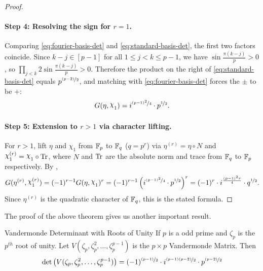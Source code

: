 \begin{proof}
  \paragraph*{Step 4: Resolving the sign for $r=1$.}
  Comparing \eqref{eq:fourier-basis-det} and \eqref{eq:standard-basis-det}, the first two factors coincide. Since $k-j\in[p-1]$ for all $1\leq j<k\leq p-1$, we have $\sin\frac{\pi(k-j)}{p}>0$, so $\prod_{j<k}2\sin\frac{\pi(k-j)}{p}>0$. Therefore the product on the right of \eqref{eq:standard-basis-det} equals $p^{\nicefrac{(p-2)}{2}}$, and matching with \eqref{eq:fourier-basis-det} forces the $\pm$ to be $+$:
  $$G(\eta,\chi_1)=i^{\nicefrac{(p-1)^2}{4}}\cdot p^{\nicefrac12}.$$

  \paragraph*{Step 5: Extension to $r>1$ via character lifting.}
  For $r>1$, lift $\eta$ and $\chi_1$ from $\mathbb{F}_p$ to $\mathbb{F}_q$ ($q=p^r$) via $\eta^{(r)}=\eta\circ N$ and $\chi_1^{(r)}=\chi_1\circ\tr$, where $N$ and $\operatorname{Tr}$ are the absolute norm and trace from $\mathbb{F}_q$ to $\mathbb{F}_p$ respectively. By \DHthm,
  $$G(\eta^{(r)},\chi_1^{(r)})=(-1)^{r-1}G(\eta,\chi_1)^r=(-1)^{r-1}\lt(i^{\nicefrac{(p-1)^2}{4}}\cdot p^{\nicefrac12}\rt)^r=(-1)^r\cdot i^{\frac{(p-1)^2r}{4}}\cdot q^{\nicefrac12}.$$
  Since $\eta^{(r)}$ is the quadratic character of $\mathbb{F}_q$, this is the stated formula.
\end{proof}

The proof of the above theorem gives us another important result. 
\begin{lemma}{Vandermonde Determinant with Roots of Unity}{}
  If $p$ is a odd prime and $\zeta_p$ is the $p^{th}$ root of unity. Let $V(\zeta_p,\zeta_p^2,\dots,\zeta_p^{p-1})$ is the $p\times p$ Vandermonde Matrix. Then $$\det\left(V(\zeta_p,\zeta_p^2,\dots,\zeta_p^{p-1})\right)=(-1)^{\nicefrac{(p-1)}{2}}\cdot i^{\nicefrac{(p-1)(p-2)}2}\cdot p^{\nicefrac{(p-2)}{2}}$$
\end{lemma}

